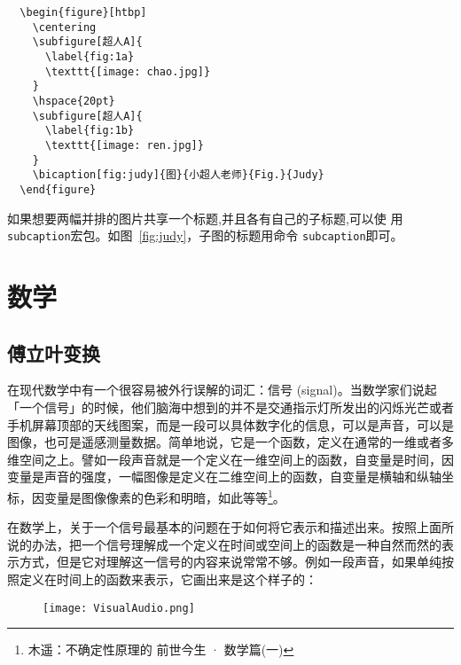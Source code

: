 \begin{figure}[htbp]
  \centering
  \hspace{20pt}
\end{figure}

\begin{lstlisting}
  \begin{figure}[htbp]
    \centering
    \subfigure[超人A]{
      \label{fig:1a}
      \texttt{[image: chao.jpg]}
    }
    \hspace{20pt}
    \subfigure[超人A]{
      \label{fig:1b}
      \texttt{[image: ren.jpg]}
    }
    \bicaption[fig:judy]{图}{小超人老师}{Fig.}{Judy}
  \end{figure}
\end{lstlisting}

如果想要两幅并排的图片共享一个标题,并且各有自己的子标题,可以使
用\texttt{subcaption}宏包。如图~\ref{fig:judy}，子图的标题用命令
\texttt{subcaption}即可。

\section{数学}

\subsection{傅立叶变换}

在现代数学中有一个很容易被外行误解的词汇：信号 (signal)。当数学家们说起
「一个信号」的时候，他们脑海中想到的并不是交通指示灯所发出的闪烁光芒或者
手机屏幕顶部的天线图案，而是一段可以具体数字化的信息，可以是声音，可以是
图像，也可是遥感测量数据。简单地说，它是一个函数，定义在通常的一维或者多
维空间之上。譬如一段声音就是一个定义在一维空间上的函数，自变量是时间，因
变量是声音的强度，一幅图像是定义在二维空间上的函数，自变量是横轴和纵轴坐
标，因变量是图像像素的色彩和明暗，如此等等\footnote{木遥：不确定性原理的
  前世今生 · 数学篇(一)}。

在数学上，关于一个信号最基本的问题在于如何将它表示和描述出来。按照上面所
说的办法，把一个信号理解成一个定义在时间或空间上的函数是一种自然而然的表
示方式，但是它对理解这一信号的内容来说常常不够。例如一段声音，如果单纯按
照定义在时间上的函数来表示，它画出来是这个样子的：

\begin{figure}[htbp]
  \centering
  \texttt{[image: VisualAudio.png]}
\end{figure}

